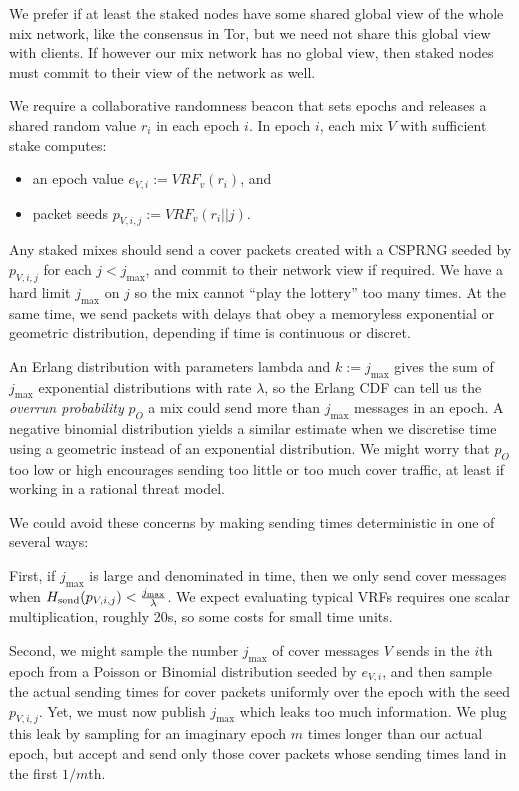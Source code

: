 ﻿\documentclass{sig-alternate-hotpets}
\newcommand{\microseconds}{\textmu s}
\begin{document}
We prefer if at least the staked nodes have some shared global view of the whole mix network, like the consensus in Tor, but we need not share this global view with clients.  If however our mix network has no global view, then staked nodes must commit to their view of the network as well. 

We require a collaborative randomness beacon that sets epochs and releases a shared random value $r_i$ in each epoch $i$.  In epoch $i$, each mix $V$ with sufficient stake computes:
\begin{itemize}
\item an epoch value $e_{V,i} := VRF_v(r_i)$, and
\item packet seeds $p_{V,i,j} := VRF_v(r_i || j)$.
\end{itemize}

Any staked mixes should send a cover packets created with a CSPRNG seeded by $p_{V,i,j}$ for each $j < j_{\max}$, and commit to their network view if required.  We have a hard limit $j_{\max}$ on $j$ so the mix cannot ``play the lottery'' too many times.  At the same time, we send packets with delays that obey a memoryless exponential or geometric distribution, depending if time is continuous or discret. 

An Erlang distribution with parameters lambda and $k := j_{\max}$ gives the sum of $j_{\max}$ exponential distributions with rate $\lambda$, so the Erlang CDF can tell us the {\em overrun probability} $p_O$ a mix could send more than $j_{\max}$ messages in an epoch.  A negative binomial distribution yields a similar estimate when we discretise time using a geometric instead of an exponential distribution.  We might worry that $p_O$ too low or high encourages sending too little or too much cover traffic, at least if working in a rational threat model.  

We could avoid these concerns by making sending times deterministic in
one of several ways:

First, if $j_{\max}$ is large and denominated in time, then we only send 
cover messages when $H_{\mathrm{send}}(p_{V,i,j}) < {j_{\max} \over \lambda}$. 
We expect evaluating typical VRFs requires one scalar multiplication,
roughly 20\microseconds, so some costs for small time units.

Second, we might sample the number $j_{\max}$ of cover messages $V$
sends in the $i$th epoch from a Poisson or Binomial distribution seeded
by $e_{V,i}$, and then sample the actual sending times for cover packets
uniformly over the epoch with the seed $p_{V,i,j}$.  Yet, we must now
publish $j_{\max}$ which leaks too much information.  We plug this leak
by sampling for an imaginary epoch $m$ times longer than our actual
epoch, but accept and send only those cover packets whose sending times
land in the first $1/m$th.  
\end{document}
